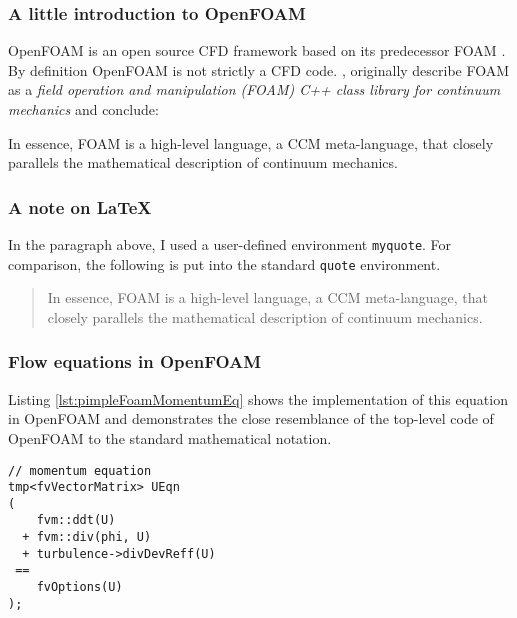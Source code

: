 \subsubsection{A little introduction to OpenFOAM}

OpenFOAM is an open source CFD framework based on its predecessor \ac{FOAM} \cite{weller1998}. By 
definition OpenFOAM is not strictly a CFD code. \citet{weller1998},
\citet{weller1992} originally describe \ac{FOAM} as a \emph{field operation and
manipulation (\ac{FOAM}) C++ class library for continuum mechanics} and conclude:

\begin{myquote}
In essence, \ac{FOAM} is a high-level language, a \acs{CCM} meta-language, that closely parallels 
the mathematical description of continuum mechanics.
\end{myquote}


\subsubsection*{A note on \LaTeX{}}

In the paragraph above, I used a user-defined environment \verb+myquote+. For comparison, 
the following is put into the standard \verb+quote+ environment.

\begin{quote}
In essence, \ac{FOAM} is a high-level language, a \acs{CCM} meta-language, that closely parallels 
the mathematical description of continuum mechanics.
\end{quote}





\subsubsection{Flow equations in OpenFOAM}

Listing \ref{lst:pimpleFoamMomentumEq} shows the implementation of this equation in OpenFOAM and demonstrates the 
close resemblance of the top-level code of OpenFOAM to the standard mathematical notation.

\begin{lstlisting}[escapechar=§,style=cppStyle,caption={The momentum equation of the transient incompressible 
	solver \emph{pimpleFoam}.},label=lst:pimpleFoamMomentumEq] 
// momentum equation
tmp<fvVectorMatrix> UEqn
(
    fvm::ddt(U)
  + fvm::div(phi, U)
  + turbulence->divDevReff(U)
 ==
    fvOptions(U)
);
\end{lstlisting}

